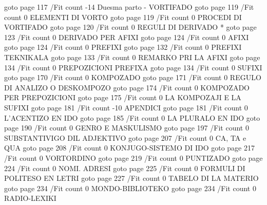 \pdfoutline goto page 117 {/Fit} count -14 {Duesma parto - VORTIFADO}
  \pdfoutline goto page 119 {/Fit} count 0 {ELEMENTI DI VORTO}
  \pdfoutline goto page 119 {/Fit} count 0 {PROCEDI DI VORTIFADO}
  \pdfoutline goto page 120 {/Fit} count 0 {REGULI DI DERIVADO *}
  \pdfoutline goto page 123 {/Fit} count 0 {DERIVADO PER AFIXI}
  \pdfoutline goto page 124 {/Fit} count 0 {AFIXI}
  \pdfoutline goto page 124 {/Fit} count 0 {PREFIXI}
  \pdfoutline goto page 132 {/Fit} count 0 {PREFIXI TEKNIKALA}
  \pdfoutline goto page 133 {/Fit} count 0 {REMARKO PRI LA AFIXI}
  \pdfoutline goto page 134 {/Fit} count 0 {PREPOZICIONI PREFIXA}
  \pdfoutline goto page 134 {/Fit} count 0 {SUFIXI}
  \pdfoutline goto page 170 {/Fit} count 0 {KOMPOZADO}
  \pdfoutline goto page 171 {/Fit} count 0 {REGULO DI ANALIZO O DESKOMPOZO}
  \pdfoutline goto page 174 {/Fit} count 0 {KOMPOZADO PER PREPOZICIONI}
  \pdfoutline goto page 175 {/Fit} count 0 {LA KOMPOZAJI E LA SUFIXI}
\pdfoutline goto page 181 {/Fit} count -10 {APENDICI}
  \pdfoutline goto page 181 {/Fit} count 0 {L'ACENTIZO EN IDO}
  \pdfoutline goto page 185 {/Fit} count 0 {LA PLURALO EN IDO}
  \pdfoutline goto page 190 {/Fit} count 0 {GENRO E MASKULISMO}
  \pdfoutline goto page 197 {/Fit} count 0 {SUBSTANTIVIGO DIL ADJEKTIVO}
  \pdfoutline goto page 207 {/Fit} count 0 {CA, TA e QUA}
  \pdfoutline goto page 208 {/Fit} count 0 {KONJUGO-SISTEMO DI IDO}
  \pdfoutline goto page 217 {/Fit} count 0 {VORTORDINO}
  \pdfoutline goto page 219 {/Fit} count 0 {PUNTIZADO}
  \pdfoutline goto page 224 {/Fit} count 0 {NOMI. ADRESI}
  \pdfoutline goto page 225 {/Fit} count 0 {FORMULI DI POLITESO EN LETRI}
\pdfoutline goto page 227 {/Fit} count 0 {TABELO DI LA MATERIO}
\pdfoutline goto page 234 {/Fit} count 0 {MONDO-BIBLIOTEKO}
\pdfoutline goto page 234 {/Fit} count 0 {RADIO-LEXIKI}
